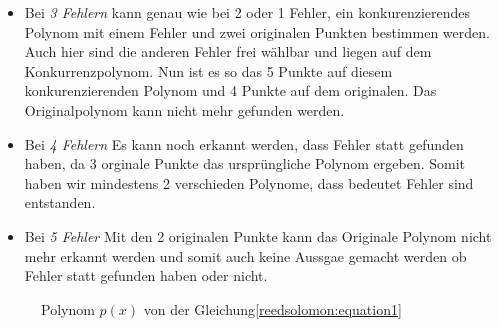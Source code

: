 \begin{beispiel}
\begin{itemize}
        Da der zweite Fehler frei wählbar ist, kann dieser auch auf dem Konkurrenzpolynom liegen, wie in der Abbilbung \ref{fig:polynom}.
        Nun haben wir, ein originales Polynom mit 5 übereinstimmenden und eine konkurrenzierendes mit 4 Punkten.
        Da 5 noch grösser als 4 ist, können wir sagen, welches das Originalpolynom ist.
    \item Bei \textit{3 Fehlern} kann genau wie bei 2 oder 1 Fehler, ein konkurenzierendes Polynom mit einem Fehler und zwei originalen Punkten bestimmen werden.
        Auch hier sind die anderen Fehler frei wählbar und liegen auf dem Konkurrenzpolynom.
        Nun ist es so das 5 Punkte auf diesem konkurenzierenden Polynom und 4 Punkte auf dem originalen.
        Das Originalpolynom kann nicht mehr gefunden werden.
    \item Bei \textit{4 Fehlern} Es kann noch erkannt werden, dass Fehler statt gefunden haben, da 3 orginale Punkte das ursprüngliche Polynom ergeben.
        Somit haben wir mindestens 2 verschieden Polynome, dass bedeutet Fehler sind entstanden.
    \item Bei \textit{5 Fehler} Mit den 2 originalen Punkte kann das Originale Polynom nicht mehr erkannt werden und 
        somit auch keine Aussgae gemacht werden ob Fehler statt gefunden haben oder nicht.
\end{itemize}

\begin{figure}%
	\centering
    
	\caption{Polynom $p(x)$ von der Gleichung\eqref{reedsolomon:equation1}}
	\label{fig:polynom}
\end{figure}
\qedhere
\end{beispiel}

